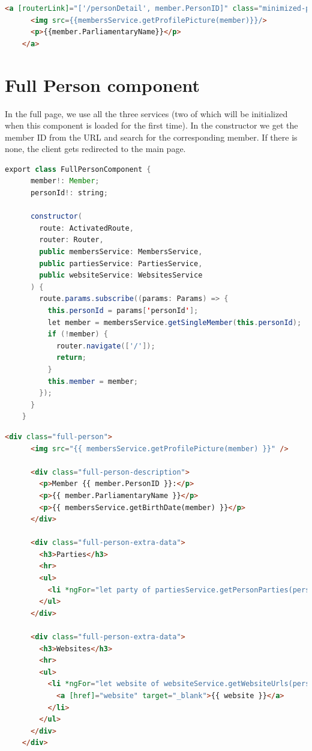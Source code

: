 \documentclass[12pt, a4paper]{article}
\begin{document}
  \begin{lstlisting}[language=html, caption={Minimized Person html}]
    <a [routerLink]="['/personDetail', member.PersonID]" class="minimized-person">
      <img src={{membersService.getProfilePicture(member)}}/>
      <p>{{member.ParliamentaryName}}</p>
    </a>\end{lstlisting}

  \pagebreak
  \section{Full Person component}

  In the full page, we use all the three services (two of which will be initialized when this component is loaded for the first time). In the constructor we get the member ID from the URL and search for the corresponding member. If there is none, the client gets redirected to the main page.

  \begin{lstlisting}[language=java, caption={Full Person component}]
    export class FullPersonComponent {
      member!: Member;
      personId!: string;

      constructor(
        route: ActivatedRoute,
        router: Router,
        public membersService: MembersService,
        public partiesService: PartiesService,
        public websiteService: WebsitesService
      ) {
        route.params.subscribe((params: Params) => {
          this.personId = params['personId'];
          let member = membersService.getSingleMember(this.personId);
          if (!member) {
            router.navigate(['/']);
            return;
          }
          this.member = member;
        });
      }
    }\end{lstlisting}

  \pagebreak
  \begin{lstlisting}[language=html, caption={Full Person html}]
    <div class="full-person">
      <img src="{{ membersService.getProfilePicture(member) }}" />
      
      <div class="full-person-description">
        <p>Member {{ member.PersonID }}:</p>
        <p>{{ member.ParliamentaryName }}</p>
        <p>{{ membersService.getBirthDate(member) }}</p>
      </div>
    
      <div class="full-person-extra-data">
        <h3>Parties</h3>
        <hr>
        <ul>
          <li *ngFor="let party of partiesService.getPersonParties(personId)">{{ party }}</li>
        </ul>
      </div>
      
      <div class="full-person-extra-data">
        <h3>Websites</h3>
        <hr>
        <ul>
          <li *ngFor="let website of websiteService.getWebsiteUrls(personId)">
            <a [href]="website" target="_blank">{{ website }}</a>
          </li>
        </ul>
      </div>
    </div>\end{lstlisting}
\end{document}

